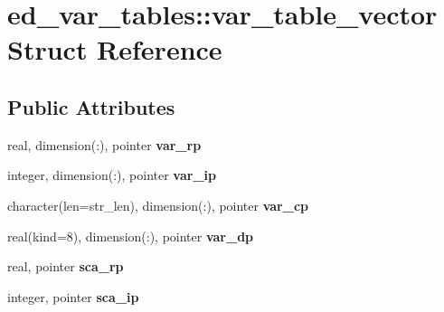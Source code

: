 \hypertarget{structed__var__tables_1_1var__table__vector}{
\section{ed\_\-var\_\-tables::var\_\-table\_\-vector Struct Reference}
\label{structed__var__tables_1_1var__table__vector}
}
\subsection*{Public Attributes}
\begin{DoxyCompactItemize}
\item 
\hypertarget{structed__var__tables_1_1var__table__vector_a142c0b17920bfd2a5ac8092e05c950d7}{
real, dimension(:), pointer {\bfseries var\_\-rp}}
\label{structed__var__tables_1_1var__table__vector_a142c0b17920bfd2a5ac8092e05c950d7}

\item 
\hypertarget{structed__var__tables_1_1var__table__vector_afaf7a4193458064321335afb36baa58b}{
integer, dimension(:), pointer {\bfseries var\_\-ip}}
\label{structed__var__tables_1_1var__table__vector_afaf7a4193458064321335afb36baa58b}

\item 
\hypertarget{structed__var__tables_1_1var__table__vector_a028c6b4eab52c9b275673cce6aee384b}{
character(len=str\_\-len), dimension(:), pointer {\bfseries var\_\-cp}}
\label{structed__var__tables_1_1var__table__vector_a028c6b4eab52c9b275673cce6aee384b}

\item 
\hypertarget{structed__var__tables_1_1var__table__vector_a9981b978ed828034d4f0710ef8be43a3}{
real(kind=8), dimension(:), pointer {\bfseries var\_\-dp}}
\label{structed__var__tables_1_1var__table__vector_a9981b978ed828034d4f0710ef8be43a3}

\item 
\hypertarget{structed__var__tables_1_1var__table__vector_a41eeadbfb5e6628f1b0dac45565ba87c}{
real, pointer {\bfseries sca\_\-rp}}
\label{structed__var__tables_1_1var__table__vector_a41eeadbfb5e6628f1b0dac45565ba87c}

\item 
\hypertarget{structed__var__tables_1_1var__table__vector_af32b8ab9bb02cc07bb13d0fdd20fbca0}{
integer, pointer {\bfseries sca\_\-ip}}
\label{structed__var__tables_1_1var__table__vector_af32b8ab9bb02cc07bb13d0fdd20fbca0}


\end{DoxyCompactItemize}
